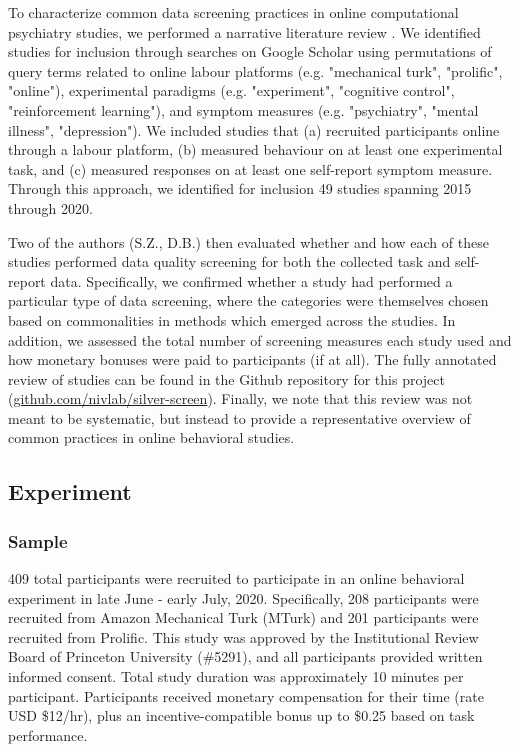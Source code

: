 \documentclass[a4paper,notitlepage,12pt]{article}
\begin{document}
To characterize common data screening practices in online computational psychiatry studies, we performed a narrative literature review \cite{grant2009typology}. We identified studies for inclusion through searches on Google Scholar using permutations of query terms related to online labour platforms (e.g. "mechanical turk", "prolific", "online"), experimental paradigms (e.g. "experiment", "cognitive control", "reinforcement learning"), and symptom measures (e.g. "psychiatry", "mental illness", "depression"). We included studies that (a) recruited participants online through a labour platform, (b) measured behaviour on at least one experimental task, and (c) measured responses on at least one self-report symptom measure. Through this approach, we identified for inclusion 49 studies spanning 2015 through 2020.

Two of the authors (S.Z., D.B.) then evaluated whether and how each of these studies performed data quality screening for both the collected task and self-report data. Specifically, we confirmed whether a study had performed a particular type of data screening, where the categories were themselves chosen based on commonalities in methods which emerged across the studies. In addition, we assessed the total number of screening measures each study used and how monetary bonuses were paid to participants (if at all). The fully annotated review of studies can be found in the Github repository for this project (\url{github.com/nivlab/silver-screen}). Finally, we note that this review was not meant to be systematic, but instead to provide a representative overview of common practices in online behavioral studies.

\subsection{Experiment}

\subsubsection{Sample}

409 total participants were recruited to participate in an online behavioral experiment in late June - early July, 2020. Specifically, 208 participants were recruited from Amazon Mechanical Turk (MTurk) and 201 participants were recruited from Prolific.  This study was approved by the Institutional Review Board of Princeton University (\#5291), and all participants provided written informed consent. Total study duration was approximately 10 minutes per participant. Participants received monetary compensation for their time (rate USD \$12/hr), plus an incentive-compatible bonus up to \$0.25 based on task performance. 
\end{document}
